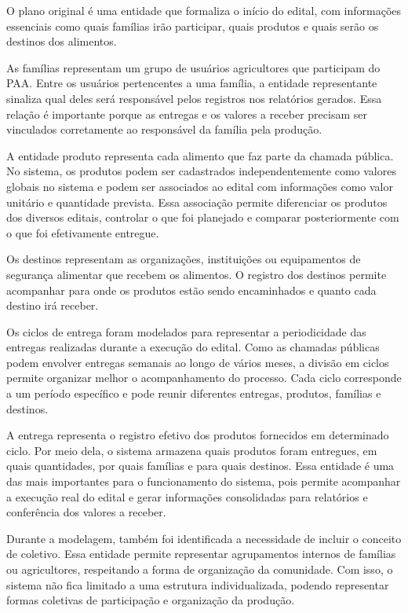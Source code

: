 \documentclass[grad,pdftex]{poli}
\begin{document}
O plano original é uma entidade que formaliza o início do edital, com informações essenciais como quais famílias irão participar, quais produtos e quais serão os destinos dos alimentos.

As famílias representam um grupo de usuários agricultores que participam do PAA. Entre os usuários pertencentes a uma família, a entidade representante sinaliza qual deles será responsável pelos registros nos relatórios gerados. Essa relação é importante porque as entregas e os valores a receber precisam ser vinculados corretamente ao responsável da família pela produção.

A entidade produto representa cada alimento que faz parte da chamada pública. No sistema, os produtos podem ser cadastrados independentemente como valores globais no sistema e podem ser associados ao edital com informações como valor unitário e quantidade prevista. Essa associação permite diferenciar os produtos dos diversos editais, controlar o que foi planejado e comparar posteriormente com o que foi efetivamente entregue.

Os destinos representam as organizações, instituições ou equipamentos de segurança alimentar que recebem os alimentos. O registro dos destinos permite acompanhar para onde os produtos estão sendo encaminhados e quanto cada destino irá receber.

Os ciclos de entrega foram modelados para representar a periodicidade das entregas realizadas durante a execução do edital. Como as chamadas públicas podem envolver entregas semanais ao longo de vários meses, a divisão em ciclos permite organizar melhor o acompanhamento do processo. Cada ciclo corresponde a um período específico e pode reunir diferentes entregas, produtos, famílias e destinos.

A entrega representa o registro efetivo dos produtos fornecidos em determinado ciclo. Por meio dela, o sistema armazena quais produtos foram entregues, em quais quantidades, por quais famílias e para quais destinos. Essa entidade é uma das mais importantes para o funcionamento do sistema, pois permite acompanhar a execução real do edital e gerar informações consolidadas para relatórios e conferência dos valores a receber.

Durante a modelagem, também foi identificada a necessidade de incluir o conceito de coletivo. Essa entidade permite representar agrupamentos internos de famílias ou agricultores, respeitando a forma de organização da comunidade. Com isso, o sistema não fica limitado a uma estrutura individualizada, podendo representar formas coletivas de participação e organização da produção.
\end{document}
